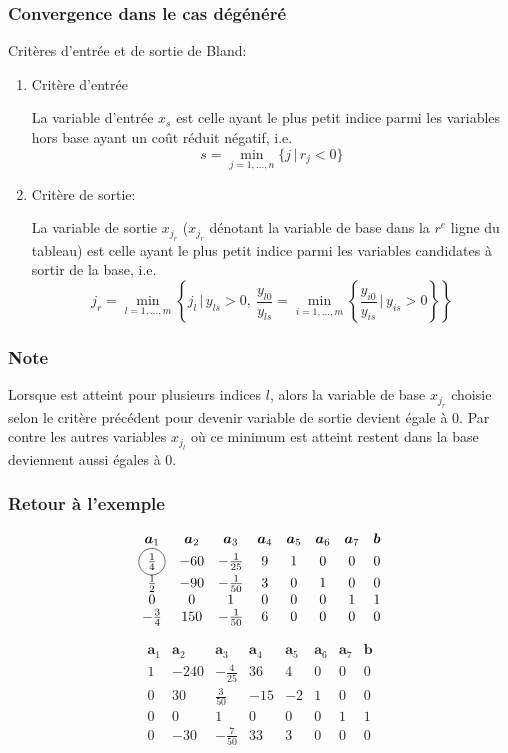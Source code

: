 \documentclass[t,usepdftitle=false]{beamer}
\newcommand*\circled[1]{\tikz[baseline=(char.base)]{
    \node[shape=circle,draw,inner sep=2pt] (char) {#1};}}
\def\ba{\boldsymbol{a}}
\def\bb{\boldsymbol{b}}
\begin{document}
\begin{frame}
	\frametitle{Convergence dans le cas dégénéré}
	
	Critères d'entrée et de sortie de Bland:
	\begin{enumerate}
		\item
		{\color{red}Critère d'entrée}
		
		La variable d'entrée $x_s$ est celle ayant le plus petit indice parmi les variables hors base ayant un coût réduit négatif, i.e.
		$$
		s = \min_{j = 1,\ldots,n} \{ j \,|\, r_j < 0 \}
		$$
		\item
		{\color{red}Critère de sortie}:
		
		La variable de sortie $x_{j_r}$ ($x_{j_r}$ dénotant la variable de base dans la $r^e$  ligne du tableau) est celle ayant le plus petit indice parmi les variables candidates à sortir de la base, i.e.
		$$
		j_r = \min_{l = 1,\ldots,m} \left\{ j_l \,|\, y_{ls} > 0,\ 
		\frac{y_{l0}}{y_{ls}} = \min_{i = 1,\ldots,m}
		\left\{ \frac{y_{i0}}{y_{is}} \,\bigg|\, y_{is} > 0 \right\}
		\right\}
		$$
		
	\end{enumerate}
	
\end{frame}

\begin{frame}
	\frametitle{Note}
	
	Lorsque
	est atteint pour plusieurs indices $l$, alors la variable de base $x_{j_r}$ choisie selon le critère précédent pour devenir variable de sortie devient égale à 0.
	Par contre les autres variables $x_{j_l}$ où ce minimum est atteint restent dans la base deviennent aussi égales à 0.
	
\end{frame}

\begin{frame}
	\frametitle{Retour à l'exemple}
	
	\[
	\begin{matrix}
		\ba_1 & \ba_2 & \ba_3 & \ba_4 & \ba_5 &\ba_6 &\ba_7 & \bb \\
		\circled{$\frac{1}{4}$} & -60 & -\frac{1}{25} & 9 & 1 & 0 & 0 & 0 \\
		\frac{1}{2} & -90 & -\frac{1}{50} & 3 & 0 & 1 & 0 & 0 \\
		0 & 0 & 1 & 0 & 0 & 0 & 1 & 1 \\
		-\frac{3}{4} & 150 & -\frac{1}{50} & 6 & 0 & 0 & 0 & 0
	\end{matrix}
	\]
	
	\[
	\begin{matrix}
		\ba_1 & \ba_2 & \ba_3 & \ba_4 & \ba_5 &\ba_6 &\ba_7 & \bb \\
		1 & -240 & -\frac{4}{25} & 36 & 4 & 0 & 0 & 0 \\
		0 & 30 & \frac{3}{50} & -15 & -2 & 1 & 0 & 0 \\
		0 & 0 & 1 & 0 & 0 & 0 & 1 & 1 \\
		0 & -30 & -\frac{7}{50} & 33 & 3 & 0 & 0 & 0
	\end{matrix}
	\]
	
\end{frame}
\end{document}
